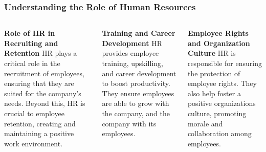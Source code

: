 \documentclass[5pt]{beamer}
\begin{document}
\begin{frame}
\frametitle{Understanding the Role of Human Resources}
\begin{columns}
\begin{column}{0.3\textwidth}
\begin{block}{\textbf{Role of HR in Recruiting and Retention}}
HR plays a critical role in the recruitment of employees, ensuring that they are suited for the company's needs. Beyond this, HR is crucial to employee retention, creating and maintaining a positive work environment.
\end{block}
\end{column}
\begin{column}{0.3\textwidth}
\begin{block}{\textbf{Training and Career Development}}
HR provides employee training, upskilling, and career development to boost productivity. They ensure employees are able to grow with the company, and the company with its employees.
\end{block}
\end{column}
\begin{column}{0.3\textwidth}
\begin{block}{\textbf{Employee Rights and Organization Culture}}
HR is responsible for ensuring the protection of employee rights. They also help foster a positive organizations culture, promoting morale and collaboration among employees.
\end{block}
\end{column}
\end{columns}
\end{frame}
\end{document}
